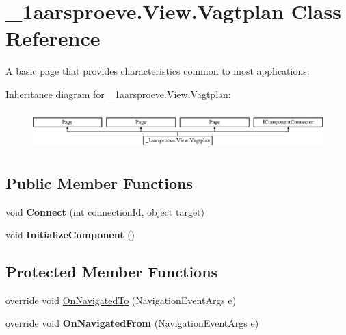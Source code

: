 \hypertarget{class__1aarsproeve_1_1_view_1_1_vagtplan}{}\section{\+\_\+1aarsproeve.\+View.\+Vagtplan Class Reference}
\label{class__1aarsproeve_1_1_view_1_1_vagtplan}


A basic page that provides characteristics common to most applications.  


Inheritance diagram for \+\_\+1aarsproeve.\+View.\+Vagtplan\+:\begin{figure}[H]
\begin{center}
\leavevmode
\includegraphics[height=1.513514cm]{class__1aarsproeve_1_1_view_1_1_vagtplan}
\end{center}
\end{figure}
\subsection*{Public Member Functions}
\begin{DoxyCompactItemize}
\item 
\hypertarget{class__1aarsproeve_1_1_view_1_1_vagtplan_ab5463d2d22c5daef5e72b0db649f28d2}{}void {\bfseries Connect} (int connection\+Id, object target)\label{class__1aarsproeve_1_1_view_1_1_vagtplan_ab5463d2d22c5daef5e72b0db649f28d2}

\item 
\hypertarget{class__1aarsproeve_1_1_view_1_1_vagtplan_a8a8cf75ef052a6e0a568fd355a812f16}{}void {\bfseries Initialize\+Component} ()\label{class__1aarsproeve_1_1_view_1_1_vagtplan_a8a8cf75ef052a6e0a568fd355a812f16}

\end{DoxyCompactItemize}
\subsection*{Protected Member Functions}
\begin{DoxyCompactItemize}
\item 
override void \hyperlink{class__1aarsproeve_1_1_view_1_1_vagtplan_a527b20b4c4b466d22919195324fe2600}{On\+Navigated\+To} (Navigation\+Event\+Args e)
\item 
\hypertarget{class__1aarsproeve_1_1_view_1_1_vagtplan_a0bc36f20e2eec79bd26ca4701a42bcec}{}override void {\bfseries On\+Navigated\+From} (Navigation\+Event\+Args e)\label{class__1aarsproeve_1_1_view_1_1_vagtplan_a0bc36f20e2eec79bd26ca4701a42bcec}

\end{DoxyCompactItemize}
